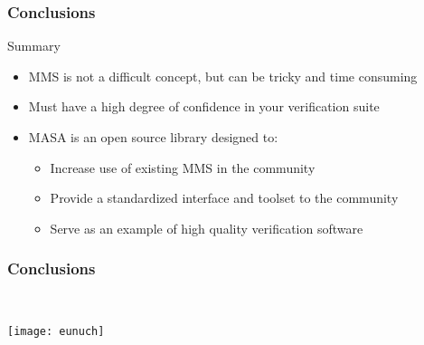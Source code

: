 \documentclass[mathserif]{beamer}
\begin{document}
 \begin{frame}
   \frametitle{Conclusions}

   \begin{block}{Summary}
     \begin{itemize}
      \item MMS is not a difficult concept, but can be tricky and time
	    consuming 
      \item Must have a high degree of confidence in your verification suite
      \item MASA is an open source library designed to:
	    \begin{itemize}
	     \item Increase use of existing MMS in the community
	     \item Provide a standardized interface and toolset to the
		   community
	     \item Serve as an example of high quality verification
		   software
	    \end{itemize}
     \end{itemize}
   \end{block}
 \end{frame}

 \begin{frame}
   \frametitle{Conclusions}

   \begin{block}{}
     \\
    \end{block}

   \centering
   \texttt{[image: eunuch]}

 \end{frame}


\end{document}
